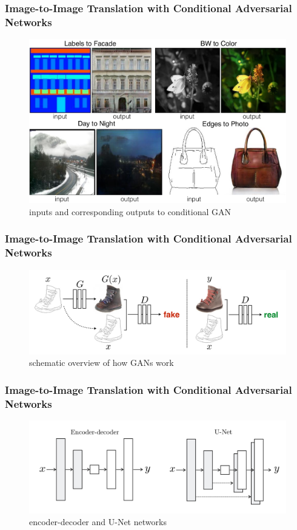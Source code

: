 \documentclass{beamer}
\begin{document}
\begin{frame}
\frametitle{Image-to-Image Translation with Conditional Adversarial Networks}
\cite{i2i}
\begin{figure}
	\includegraphics[width=0.6\linewidth]{../images/i2i.png}
	\caption{inputs and corresponding outputs to conditional GAN}
\end{figure}
\end{frame}

\begin{frame}
\frametitle{Image-to-Image Translation with Conditional Adversarial Networks}
\begin{figure}
	\includegraphics[width=\linewidth]{../images/i2i_GAN.png}
	\caption{schematic overview of how GANs work}
\end{figure}
\end{frame}

\begin{frame}
\frametitle{Image-to-Image Translation with Conditional Adversarial Networks}
\begin{figure}
	\includegraphics[width=\linewidth]{../images/i2i_unet.png}
	\caption{encoder-decoder and U-Net networks}
\end{figure}
\end{frame}
\end{document}
